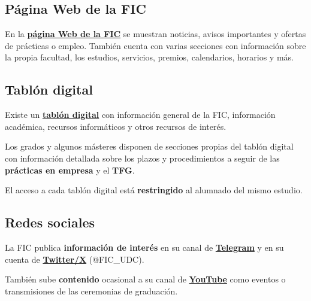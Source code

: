 \subsection{Página Web de la FIC}

En  la \href{https://www.fic.udc.es/}{\textbf{página Web de la \acrshort{FIC}}} se muestran noticias, avisos importantes y ofertas de prácticas o empleo. También cuenta con varias secciones con información sobre la propia facultad, los estudios, servicios, premios, calendarios, horarios y más.

\FloatBarrier
\begin{figure}[htp]
    \centering
\end{figure}
\FloatBarrier

\subsection{Tablón digital}

Existe un \textbf{\href{https://taboleirofic.udc.es/}{tablón digital}} con información general de la \acrshort{FIC}, información académica, recursos informáticos y otros recursos de interés.

\begin{infoBox}
    Los grados y algunos másteres disponen de secciones propias del tablón digital con información detallada sobre los plazos y procedimientos a seguir de las \textbf{prácticas en empresa} y el \textbf{\acrlong{TFG}}.
\end{infoBox}

\begin{warningBox}
    El acceso a cada tablón digital está \textbf{restringido} al alumnado del mismo estudio.
\end{warningBox}

\subsection{Redes sociales}

La \acrshort{FIC} publica \textbf{información de interés} en su canal de \href{https://t.me/+LHa3QApmGskyNDFk}{\textbf{Telegram}} y en su cuenta de \href{https://x.com/FIC_UDC}{\textbf{Twitter/X}} (@FIC\_UDC).

También sube \textbf{contenido} ocasional a su canal de \href{https://www.youtube.com/@facultaddeinformaticadeaco4211}{\textbf{YouTube}} como eventos o transmisiones de las ceremonias de graduación.



